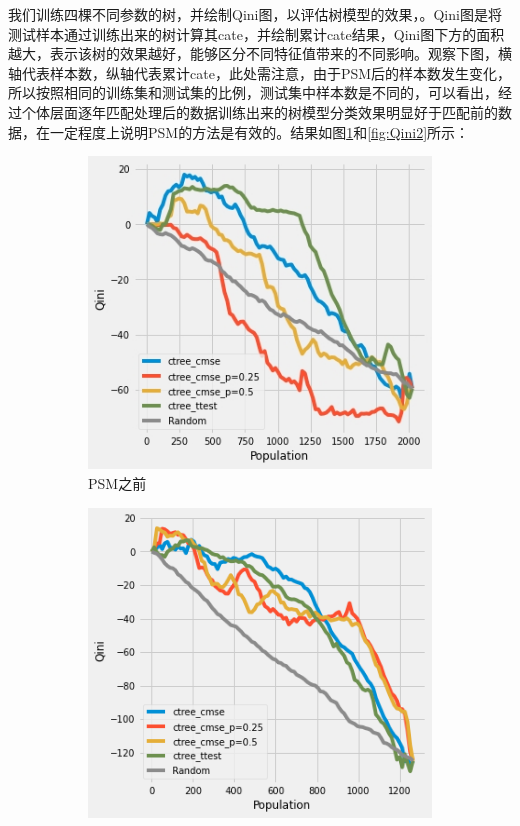 \documentclass[a4paper,12pt]{article}
\begin{document}
我们训练四棵不同参数的树，并绘制Qini图，以评估树模型的效果，。Qini图是将测试样本通过训练出来的树计算其cate，并绘制累计cate结果，Qini图下方的面积越大，表示该树的效果越好，能够区分不同特征值带来的不同影响。观察下图，横轴代表样本数，纵轴代表累计cate，此处需注意，由于PSM后的样本数发生变化，所以按照相同的训练集和测试集的比例，测试集中样本数是不同的，可以看出，经过个体层面逐年匹配处理后的数据训练出来的树模型分类效果明显好于匹配前的数据，在一定程度上说明PSM的方法是有效的。结果如图\ref{fig:Qini1}和\ref{fig:Qini2}所示：

\begin{figure}[H]
    \centering
    \caption{Qini图对比}
    \begin{subfigure}[b]{0.45\textwidth}
        \centering
        \includegraphics[width=\textwidth]{Qini1.png}
        \caption{PSM之前}
        \label{fig:Qini1}
    \end{subfigure}
    \hfill
    \begin{subfigure}[b]{0.45\textwidth}
        \centering
        \includegraphics[width=\textwidth]{Qini2.jpg}

\end{subfigure}
\end{figure}
\end{document}
